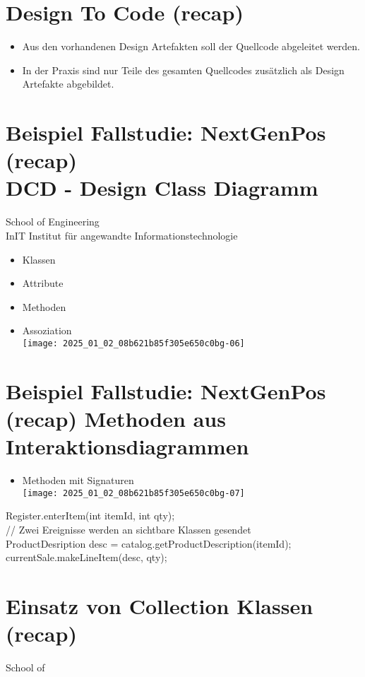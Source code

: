 \documentclass[10pt]{article}
\begin{document}
\section*{Design To Code (recap)}
\begin{itemize}
  \item Aus den vorhandenen Design Artefakten soll der Quellcode abgeleitet werden.
  \item In der Praxis sind nur Teile des gesamten Quellcodes zusätzlich als Design Artefakte abgebildet.
\end{itemize}

\section*{Beispiel Fallstudie: NextGenPos (recap) \\
 DCD - Design Class Diagramm}
School of Engineering\\
InIT Institut für angewandte Informationstechnologie

\begin{itemize}
  \item Klassen
  \item Attribute
  \item Methoden
  \item Assoziation\\
\texttt{[image: 2025\_01\_02\_08b621b85f305e650c0bg-06]}
\end{itemize}

\section*{Beispiel Fallstudie: NextGenPos (recap) Methoden aus Interaktionsdiagrammen}
\begin{itemize}
  \item Methoden mit Signaturen\\
\texttt{[image: 2025\_01\_02\_08b621b85f305e650c0bg-07]}
\end{itemize}

Register.enterItem(int itemId, int qty);\\
// Zwei Ereignisse werden an sichtbare Klassen gesendet\\
ProductDesription desc = catalog.getProductDescription(itemId); currentSale.makeLineItem(desc, qty);

\section*{Einsatz von Collection Klassen (recap)}
School of
\end{document}
